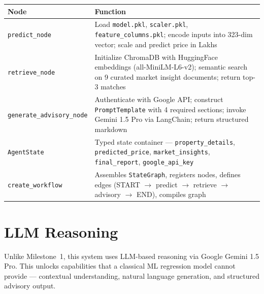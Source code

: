 \documentclass[11pt,a4paper]{article}
\newcommand{\tableheadercolor}{\rowcolor{headerblue}}
\newcommand{\tableheaderfont}{\color{white}\bfseries}
\begin{document}
\vspace{0.6em}
\begin{tabularx}{\textwidth}{>{\raggedright\arraybackslash}p{4cm}
                              >{\raggedright\arraybackslash}X}
\tableheadercolor
\tableheaderfont Node & \tableheaderfont Function \\
\midrule
\texttt{predict\_node}             & Load \texttt{model.pkl}, \texttt{scaler.pkl}, \texttt{feature\_columns.pkl}; encode inputs into 323-dim vector; scale and predict price in Lakhs \\[8pt]
\texttt{retrieve\_node}            & Initialize ChromaDB with HuggingFace embeddings (all-MiniLM-L6-v2); semantic search on 9 curated market insight documents; return top-3 matches \\[8pt]
\texttt{generate\_advisory\_node}  & Authenticate with Google API; construct \texttt{PromptTemplate} with 4 required sections; invoke Gemini 1.5 Pro via LangChain; return structured markdown \\[8pt]
\texttt{AgentState}                & Typed state container --- \texttt{property\_details}, \texttt{predicted\_price}, \texttt{market\_insights}, \texttt{final\_report}, \texttt{google\_api\_key} \\[8pt]
\texttt{create\_workflow}          & Assembles \texttt{StateGraph}, registers nodes, defines edges (START $\rightarrow$ predict $\rightarrow$ retrieve $\rightarrow$ advisory $\rightarrow$ END), compiles graph \\
\bottomrule
\end{tabularx}


\newpage

\section{LLM Reasoning}

Unlike Milestone~1, this system uses LLM-based reasoning via Google Gemini 1.5 Pro. This unlocks capabilities that a classical ML regression model cannot provide --- contextual understanding, natural language generation, and structured advisory output.
\end{document}
